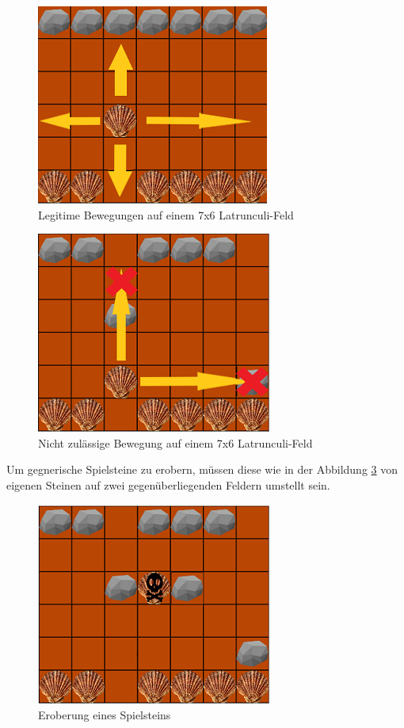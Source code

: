 \begin{figure}[h]
	\centering
	\includegraphics{img/regeln_bewegung22}
	\caption{Legitime Bewegungen auf einem 7x6 Latrunculi-Feld}
	\label{fig:Bewegungen}
\end{figure}

\begin{figure}[h]
	\centering
	\includegraphics{img/regeln_nottodo2}
	\caption{Nicht zulässige Bewegung auf einem 7x6 Latrunculi-Feld}
	\label{fig:nottodo}
\end{figure}

Um gegnerische Spielsteine zu erobern, müssen diese wie in der Abbildung \ref{fig:erobern} von eigenen Steinen auf zwei gegenüberliegenden Feldern umstellt sein.


\begin{figure}[h]
	\centering
	\includegraphics{img/regeln_erobern2}
	\caption{Eroberung eines Spielsteins}
	\label{fig:erobern}
\end{figure}


